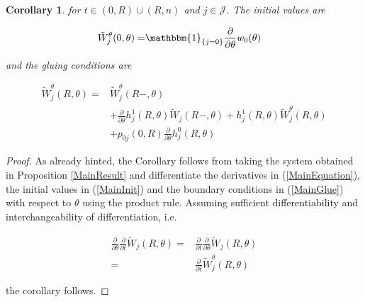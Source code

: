\documentclass{article}
\newcommand{\1}[1]{\mathbbm{1}_{\left\lbrace #1 \right\rbrace}}
\theoremstyle{break}
\newtheorem{corollary}[definition]{Corollary}
\theoremstyle{remark}
\numberwithin{equation}{section}
\begin{document}
\begin{corollary}
	for $t \in (0,R)\cup(R,n)$ and $j \in \mathcal{J}$. The initial values are
	
	\begin{align*}
		\tilde{W}_j^\theta(0,\theta) =& \1{j=0} \frac{\partial}{\partial \theta} w_0(\theta)
	\end{align*}
	
	and the gluing conditions are
	
	\begin{align*}
		\tilde{W}_j^\theta(R,\theta) =& \tilde{W}_j^\theta(R-,\theta) \\
		&+ \frac{\partial}{\partial \theta}h_j^1(R,\theta) \tilde{W}_j(R-,\theta) + h_j^1(R,\theta) \tilde{W}_j^\theta(R,\theta) \\
		&+ p_{0j}(0,R) \frac{\partial}{\partial \theta} h_j^0(R,\theta)
	\end{align*}
\end{corollary}
\begin{proof}
	As already hinted, the Corollary follows from taking the system obtained in Proposition \ref{MainResult} and differentiate the derivatives in (\ref{MainEquation}), the initial values in (\ref{MainInit}) and the boundary conditions in (\ref{MainGlue}) with respect to $\theta$ using the product rule. Assuming sufficient differentiability and interchangeability of differentiation, i.e.
	
	\begin{align*}
		\frac{\partial}{\partial \theta} \frac{\partial}{\partial t} \tilde{W}_j(R,\theta) =& \frac{\partial}{\partial t} \frac{\partial}{\partial \theta} \tilde{W}_j(R,\theta) \\
		=& \frac{\partial}{\partial t} \tilde{W}_j^\theta(R,\theta)
	\end{align*}

	the corollary follows.
\end{proof}
\end{document}
